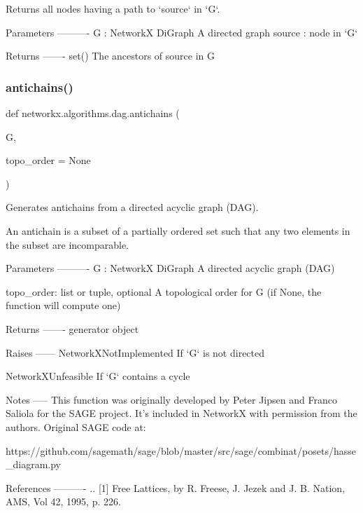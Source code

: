 \begin{DoxyVerb}Returns all nodes having a path to `source` in `G`.

Parameters
----------
G : NetworkX DiGraph
    A directed graph
source : node in `G`

Returns
-------
set()
    The ancestors of source in G
\end{DoxyVerb}
 \mbox{\label{namespacenetworkx_1_1algorithms_1_1dag_a269f94d57f2a7ef7559754d4f6d8032d}} 
\subsubsection{\texorpdfstring{antichains()}{antichains()}}
{\footnotesize\ttfamily def networkx.\+algorithms.\+dag.\+antichains (\begin{DoxyParamCaption}\item[{}]{G,  }\item[{}]{topo\+\_\+order = {\ttfamily None} }\end{DoxyParamCaption})}

\begin{DoxyVerb}Generates antichains from a directed acyclic graph (DAG).

An antichain is a subset of a partially ordered set such that any
two elements in the subset are incomparable.

Parameters
----------
G : NetworkX DiGraph
    A directed acyclic graph (DAG)

topo_order: list or tuple, optional
    A topological order for G (if None, the function will compute one)

Returns
-------
generator object

Raises
------
NetworkXNotImplemented
    If `G` is not directed

NetworkXUnfeasible
    If `G` contains a cycle

Notes
-----
This function was originally developed by Peter Jipsen and Franco Saliola
for the SAGE project. It's included in NetworkX with permission from the
authors. Original SAGE code at:

https://github.com/sagemath/sage/blob/master/src/sage/combinat/posets/hasse_diagram.py

References
----------
.. [1] Free Lattices, by R. Freese, J. Jezek and J. B. Nation,
   AMS, Vol 42, 1995, p. 226.
\end{DoxyVerb}
 \mbox{\label{namespacenetworkx_1_1algorithms_1_1dag_abbfb030d483ff43f5f7da173db47ee4a}} 
